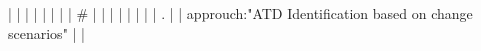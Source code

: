 |    |            |      |                                                                      |                                                                                                                                                                          |                                                                                                                                                                                                                                                            |                                                                                                                                                                                                                                                                      |  #                                                                                                                                                                                                                                                                                                       |                                                                                                                                                                                                                                                                                                                                                                                                                                                                                              |
|    |            |      |                                                                      |                                                                                                                                                                          | .                                                                                                                                                                                                                                                          |                                                                                                                                                                                                                                                                      |  approuch:"ATD Identification based on change scenarios"                                                                                                                                                                                                                                                 |                                                                                                                                                                                                                                                                                                                                                                                                                                                                                              |
